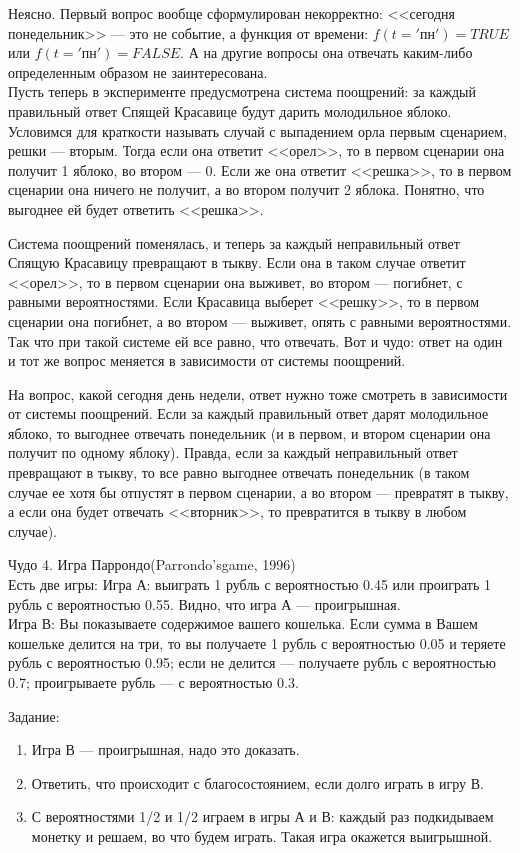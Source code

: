 Неясно. Первый вопрос вообще сформулирован некорректно: <<сегодня понедельник>> --- это не событие, а функция от времени: $f(t='пн')=TRUE$ или $f(t='пн')=FALSE$.
А на другие вопросы она отвечать каким-либо определенным образом не заинтересована. \\

Пусть теперь в эксперименте предусмотрена система поощрений: за каждый правильный ответ Спящей Красавице будут дарить молодильное яблоко. 
Условимся для краткости называть случай с выпадением орла первым сценарием, решки --- вторым.
Тогда если она ответит <<орел>>, то в первом сценарии она получит 1 яблоко, во втором --- 0.
Если же она ответит <<решка>>, то в первом сценарии она ничего не получит, а во втором получит 2 яблока.
Понятно, что выгоднее ей будет ответить <<решка>>.

Система поощрений поменялась, и теперь за каждый неправильный ответ Спящую Красавицу превращают в тыкву.
Если она в таком случае ответит <<орел>>, то в первом сценарии она выживет, во втором --- погибнет, с равными вероятностями. Если Красавица выберет <<решку>>, то в первом сценарии она  погибнет, а во втором --- выживет, опять с равными вероятностями. Так что при такой системе ей все равно, что отвечать.
Вот и чудо: ответ на один и тот же вопрос меняется в зависимости от системы поощрений.

На вопрос, какой сегодня день недели, ответ нужно тоже смотреть в зависимости от системы поощрений. Если за каждый правильный ответ дарят молодильное яблоко, то выгоднее отвечать понедельник (и в первом, и втором сценарии она получит по одному яблоку). Правда, если за каждый неправильный ответ превращают в тыкву, то все равно выгоднее отвечать понедельник (в таком случае ее хотя бы отпустят в первом сценарии, а во втором --- превратят в тыкву, а если она будет отвечать <<вторник>>, то превратится в тыкву в любом случае).

Чудо 4. Игра Паррондо(Parrondo'sgame, 1996)\\
Есть две игры:
Игра А: выиграть 1 рубль с вероятностью 0.45 или проиграть 1 рубль с вероятностью 0.55. Видно, что игра А --- проигрышная.\\
Игра В: Вы показываете содержимое вашего кошелька. Если сумма в Вашем кошельке делится на три, то вы получаете 1 рубль с вероятностью 0.05 и теряете рубль с вероятностью 0.95; если не делится --- получаете рубль с вероятностью 0.7; проигрываете рубль --- с вероятностью 0.3.

Задание:
\begin{enumerate}
\item Игра В --- проигрышная, надо это доказать.
\item Ответить, что происходит с благосостоянием, если долго играть в игру В.
\item С вероятностями 1/2 и 1/2 играем в игры А и В: каждый раз подкидываем монетку и решаем, во что будем играть. Такая игра окажется выигрышной.
\end{enumerate}

